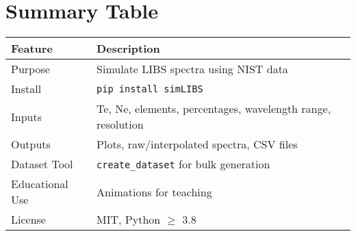 \documentclass[12pt,a4paper]{article}
\begin{document}
	\section{Summary Table}
	\begin{center}
		\begin{tabular}{@{}ll@{}}
			\toprule
			\textbf{Feature} & \textbf{Description} \\
			\midrule
			Purpose & Simulate LIBS spectra using NIST data \\
			Install & \verb|pip install simLIBS| \\
			Inputs & Te, Ne, elements, percentages, wavelength range, resolution \\
			Outputs & Plots, raw/interpolated spectra, CSV files \\
			Dataset Tool & \verb|create_dataset| for bulk generation \\
			Educational Use & Animations for teaching \\
			License & MIT, Python $\geq$ 3.8 \\
			\bottomrule
		\end{tabular}
	\end{center}
	
	\newpage
	
	

	
\end{document}
